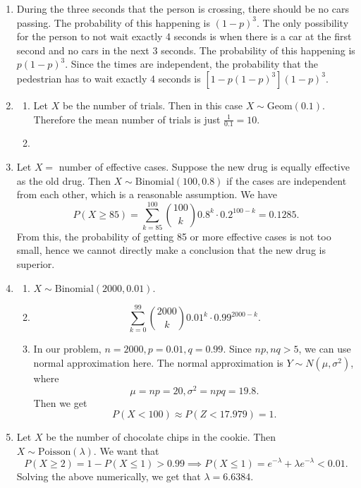 \documentclass{article}
\begin{document}
\begin{enumerate}
    \item During the three seconds that the person is crossing, there should be no cars passing. 
    The probability of this happening is $(1 - p)^3$. The only possibility for the person to 
    not wait exactly 4 seconds is when there is a car at the first second and no cars in the 
    next 3 seconds. The probability of this happening is $p(1 - p)^3$. Since the times are 
    independent, the probability that the pedestrian has to wait exactly 4 seconds is 
    $[1 - p(1 - p)^3] (1 - p)^3$.

    \item \begin{enumerate}
        \item Let $X$ be the number of trials. Then in this case $X \sim \text{Geom}(0.1)$. 
        Therefore the mean number of trials is just $\frac{1}{0.1} = 10$.

        \item 
    \end{enumerate}

    \item Let $X = $ number of effective cases. Suppose the new drug is equally effective as 
    the old drug. Then $X \sim \text{Binomial}(100, 0.8)$ if the cases are independent from each 
    other, which is a reasonable assumption. We have 
    \[ P(X \geq 85) = \sum_{k = 85}^{100}\binom{100}{k} 0.8^{k} \cdot 0.2^{100 - k} = 0.1285. \]
    From this, the probability of getting 85 or more effective cases is not too small, hence we 
    cannot directly make a conclusion that the new drug is superior.

    \item \begin{enumerate}
        \item $X \sim \text{Binomial}(2000, 0.01)$.

        \item \[ \sum_{k = 0}^{99} \binom{2000}{k} 0.01^{k} \cdot 0.99^{2000 - k}. \]

        \item In our problem, $n = 2000, p = 0.01, q = 0.99$. Since $np, nq > 5$, we can use 
        normal approximation here. The normal approximation is $Y \sim N(\mu, \sigma^2)$, where 
        \[ \mu = np = 20, \sigma^2 = npq = 19.8. \]
        Then we get 
        \[ P(X < 100) \approx P(Z < 17.979) = 1. \]
    \end{enumerate}

    \item Let $X$ be the number of chocolate chips in the cookie. Then 
    $X \sim \text{Poisson}(\lambda)$. We want that 
    \[ P(X \geq 2) = 1 - P(X \leq 1) > 0.99 \implies P(X \leq 1) 
    = e^{-\lambda} + \lambda e^{-\lambda} < 0.01. \]
    Solving the above numerically, we get that $\lambda = 6.6384.$


\end{enumerate}
\end{document}
